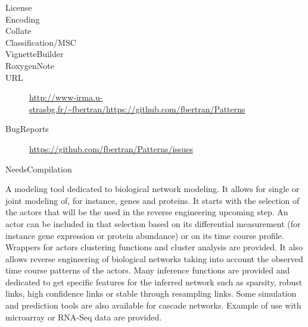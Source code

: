 \documentclass[a4paper]{book}
\begin{document}
\begin{description}
\item[License]
\item[Encoding]
\item[Collate]
\item[Classification/MSC]
\item[VignetteBuilder]
\item[RoxygenNote]
\item[URL]\AsIs{}\url{http://www-irma.u-strasbg.fr/~fbertran/}\AsIs{,
}\url{https://github.com/fbertran/Patterns}\AsIs{}
\item[BugReports]\AsIs{}\url{https://github.com/fbertran/Patterns/issues}\AsIs{}
\item[NeedsCompilation]
\end{description}
%
\begin{Description}\relax
A modeling tool dedicated to biological network modeling. It allows for single or joint modeling of, for instance, genes and proteins. It starts with the selection of the actors that will be the used in the reverse engineering upcoming step. An actor can be included in that selection based on its differential measurement (for instance gene expression or protein abundance) or on its time course profile. Wrappers for actors clustering functions and cluster analysis are provided. It also allows reverse engineering of biological networks taking into account the observed time course patterns of the actors. Many inference functions are provided and dedicated to get specific features for the inferred network such as sparsity, robust links, high confidence links or stable through resampling links. Some simulation and prediction tools are also available for cascade networks. Example of use with microarray or RNA-Seq data are provided.
\end{Description}
%
\begin{Details}\relax


\end{Details}
\end{document}
